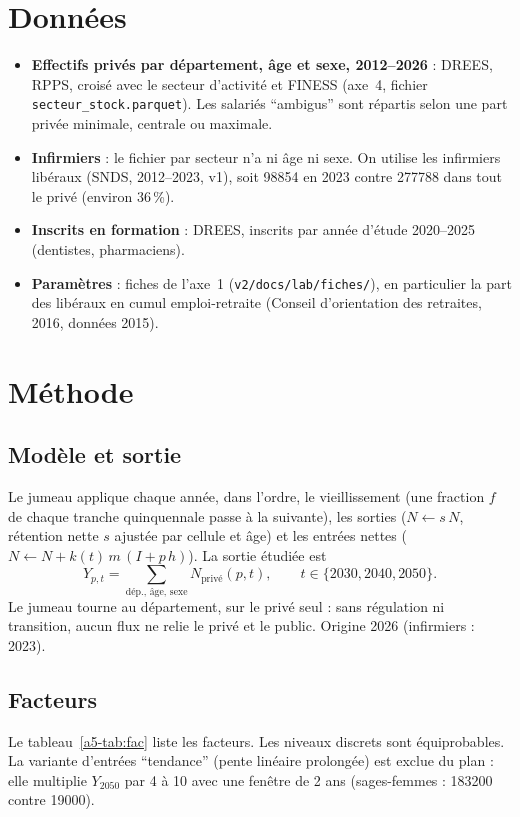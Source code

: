 \section{Données}
\begin{itemize}
  \item \textbf{Effectifs privés par département, âge et sexe, 2012--2026} : DREES, RPPS, croisé avec le secteur
        d'activité et FINESS (axe~4, fichier \texttt{secteur\_stock.parquet}). Les salariés
        \enquote{ambigus} sont répartis selon une part privée minimale, centrale ou maximale.
  \item \textbf{Infirmiers} : le fichier par secteur n'a ni âge ni sexe. On utilise les infirmiers libéraux (SNDS,
        2012--2023, v1), soit \num{98854}\mesure{} en 2023 contre \num{277788}\mesure{} dans tout le privé
        (environ 36\,\%\derive{}).
  \item \textbf{Inscrits en formation} : DREES, inscrits par année d'étude 2020--2025 (dentistes, pharmaciens).
  \item \textbf{Paramètres} : fiches de l'axe~1 (\texttt{v2/docs/lab/fiches/}), en particulier la part des
        libéraux en cumul emploi-retraite (Conseil d'orientation des retraites, 2016, données 2015).
\end{itemize}

\section{Méthode}
\subsection{Modèle et sortie}
Le jumeau applique chaque année, dans l'ordre, le vieillissement (une fraction $f$ de chaque tranche quinquennale
passe à la suivante), les sorties ($N \leftarrow s\,N$, rétention nette $s$ ajustée par cellule et âge) et les
entrées nettes ($N \leftarrow N + k(t)\,m\,(I + p\,h)$). La sortie étudiée est
\[
  Y_{p,t} = \sum_{\text{dép., âge, sexe}} N_{\text{privé}}(p, t), \qquad t \in \{2030, 2040, 2050\}.
\]
Le jumeau tourne au département, sur le privé seul : sans régulation ni transition, aucun flux ne relie le privé et
le public. Origine 2026 (infirmiers : 2023).

\subsection{Facteurs}
Le tableau~\ref{a5-tab:fac} liste les facteurs. Les niveaux discrets sont équiprobables\suppose{}. La variante
d'entrées \enquote{tendance} (pente linéaire prolongée) est exclue du plan : elle multiplie $Y_{2050}$ par 4 à
10\mesure{} avec une fenêtre de 2 ans (sages-femmes : \num{183200} contre \num{19000}\mesure{}).


